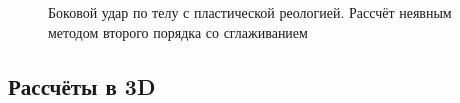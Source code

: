 \begin{figure}
\begin{minipage}[h]{0.47\linewidth}
 \\
\end{minipage}
\hfill
\begin{minipage}[h]{0.47\linewidth}
 \\
\end{minipage}
\caption{Боковой удар по телу с пластической реологией. Рассчёт неявным методом второго порядка со сглаживанием}
\label{pic:implicit}
\end{figure}

\subsection{Рассчёты в 3D}